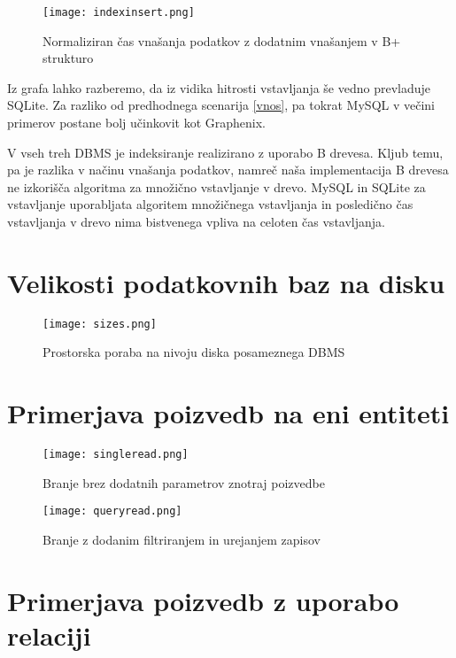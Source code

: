 \documentclass[a4paper,12pt,openright]{book}
\begin{document}
    \begin{figure}[H]
        \centerline{\texttt{[image: indexinsert.png]}}
        \caption{Normaliziran čas vnašanja podatkov z dodatnim vnašanjem v B+ strukturo}
        \label{index_vnos}
    \end{figure}

    \noindent
    Iz grafa lahko razberemo, da iz vidika hitrosti vstavljanja še vedno prevladuje SQLite. Za razliko od predhodnega scenarija \ref{vnos}, pa tokrat MySQL v večini primerov postane bolj učinkovit kot Graphenix.

    V vseh treh DBMS je indeksiranje realizirano z uporabo B drevesa. Kljub temu, pa je razlika v načinu vnašanja podatkov, namreč naša implementacija B drevesa ne izkorišča algoritma za množično vstavljanje v drevo. MySQL in SQLite za vstavljanje uporabljata algoritem množičnega vstavljanja in posledično čas vstavljanja v drevo nima bistvenega vpliva na celoten čas vstavljanja.
 
    \section{Velikosti podatkovnih baz na disku}
    \begin{figure}[H]
        \centerline{\texttt{[image: sizes.png]}}
        \caption{Prostorska poraba na nivoju diska posameznega DBMS}
        \label{velikosti}
    \end{figure}

    \newpage
    \section{Primerjava poizvedb na eni entiteti}

    \begin{figure}[H]
        \centerline{\texttt{[image: singleread.png]}}
        \caption{Branje brez dodatnih parametrov znotraj poizvedbe}
        \label{branje}
    \end{figure}

    \begin{figure}[H]
        \centerline{\texttt{[image: queryread.png]}}
        \caption{Branje z dodanim filtriranjem in urejanjem zapisov}
        \label{queryread}
    \end{figure}

    \newpage
    \section{Primerjava poizvedb z uporabo relaciji}
\end{document}
